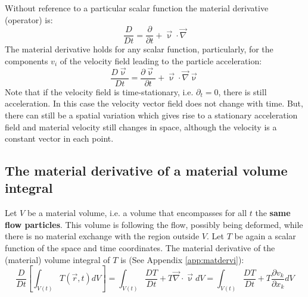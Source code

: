 Without reference to a particular scalar function the material 
derivative (operator) is:
\begin{equation}
\frac{D}{Dt} = \frac{\partial }{\partial t}
+\vec{\upnu} \cdot \vec\nabla 
\label{eq:md07}
\end{equation}
The material derivative holds for any scalar function, 
particularly, for the components $v_i$
of the velocity field leading to the particle acceleration:
\begin{equation}
\frac{D \vec{\upnu}}{Dt} 
= \frac{\partial \vec{\upnu}}{\partial t} + \vec{\upnu} \cdot \vec\nabla \vec{\upnu}
\label{eq:md08}
\end{equation}
Note that if the velocity field is time-stationary, i.e. 
$\partial_t=0$, there is still acceleration. In
this case the velocity vector field does not change with time. 
But, there can still be a
spatial variation which gives rise to a stationary acceleration 
field and material velocity
still changes in space, although the velocity is a constant vector in each point.

\vspace{0.5cm}
\vspace{0.5cm}

\subsection{The material derivative of a material volume integral}
Let $V$ be a material volume, i.e. a
volume that encompasses for all $t$ the {\bf same flow particles}. 
This volume is following the
flow, possibly being deformed, while there is no material exchange 
with the region outside $V$. Let $T$ be again a scalar function 
of the space and time coordinates. The
material derivative of the (material) volume integral 
of $T$ is (See Appendix \ref{app:matdervi}):
\begin{equation}
\frac{D}{Dt}
\left[
\int_{V(t)} T(\vec{r},t) dV
\right]
=
\int_{V(t)} \frac{DT}{Dt} + T \vec\nabla\cdot \vec\upnu dV
=
\int_{V(t)} \frac{DT}{Dt} + T \frac{\partial v_k}{\partial x_k} dV
\label{eq:md09}
\end{equation}


